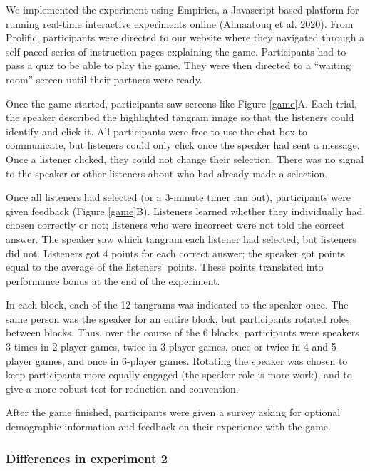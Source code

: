 \documentclass[
  english,
  a4paper,
]{article}
\begin{document}
We implemented the experiment using Empirica, a Javascript-based platform for running real-time interactive experiments online (\protect\hyperlink{ref-almaatouqEmpiricaVirtualLab2020}{Almaatouq et al. 2020}). From Prolific, participants were directed to our website where they navigated through a self-paced series of instruction pages explaining the game. Participants had to pass a quiz to be able to play the game. They were then directed to a ``waiting room'' screen until their partners were ready.

Once the game started, participants saw screens like Figure \ref{game}A. Each trial, the speaker described the highlighted tangram image so that the listeners could identify and click it. All participants were free to use the chat box to communicate, but listeners could only click once the speaker had sent a message. Once a listener clicked, they could not change their selection. There was no signal to the speaker or other listeners about who had already made a selection.

Once all listeners had selected (or a 3-minute timer ran out), participants were given feedback (Figure \ref{game}B). Listeners learned whether they individually had chosen correctly or not; listeners who were incorrect were not told the correct answer. The speaker saw which tangram each listener had selected, but listeners did not. Listeners got 4 points for each correct answer; the speaker got points equal to the average of the listeners' points. These points translated into performance bonus at the end of the experiment.

In each block, each of the 12 tangrams was indicated to the speaker once. The same person was the speaker for an entire block, but participants rotated roles between blocks. Thus, over the course of the 6 blocks, participants were speakers 3 times in 2-player games, twice in 3-player games, once or twice in 4 and 5-player games, and once in 6-player games. Rotating the speaker was chosen to keep participants more equally engaged (the speaker role is more work), and to give a more robust test for reduction and convention.

After the game finished, participants were given a survey asking for optional demographic information and feedback on their experience with the game.

\hypertarget{differences-in-experiment-2}{%
\subsubsection{Differences in experiment 2}\label{differences-in-experiment-2}}
\end{document}
